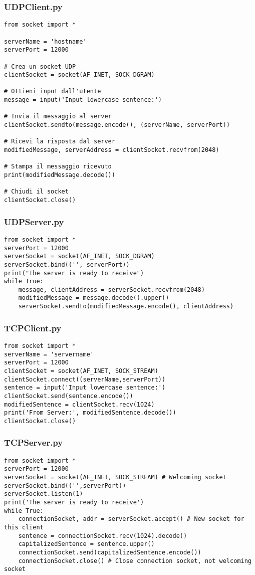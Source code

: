 \subsubsection{UDPClient.py}
\begin{verbatim}
from socket import *

serverName = 'hostname'
serverPort = 12000

# Crea un socket UDP
clientSocket = socket(AF_INET, SOCK_DGRAM)

# Ottieni input dall'utente
message = input('Input lowercase sentence:')

# Invia il messaggio al server
clientSocket.sendto(message.encode(), (serverName, serverPort))

# Ricevi la risposta dal server
modifiedMessage, serverAddress = clientSocket.recvfrom(2048)

# Stampa il messaggio ricevuto
print(modifiedMessage.decode())

# Chiudi il socket
clientSocket.close()
\end{verbatim}

\subsubsection{UDPServer.py}
\begin{verbatim}
from socket import *
serverPort = 12000
serverSocket = socket(AF_INET, SOCK_DGRAM)
serverSocket.bind(('', serverPort))
print("The server is ready to receive")
while True:
    message, clientAddress = serverSocket.recvfrom(2048)
    modifiedMessage = message.decode().upper()
    serverSocket.sendto(modifiedMessage.encode(), clientAddress)
\end{verbatim}

\subsubsection{TCPClient.py}
\begin{verbatim}
from socket import *
serverName = 'servername'
serverPort = 12000
clientSocket = socket(AF_INET, SOCK_STREAM)
clientSocket.connect((serverName,serverPort))
sentence = input('Input lowercase sentence:')
clientSocket.send(sentence.encode())
modifiedSentence = clientSocket.recv(1024)
print('From Server:', modifiedSentence.decode())
clientSocket.close()
\end{verbatim}

\subsubsection{TCPServer.py}
\begin{verbatim}
from socket import *
serverPort = 12000
serverSocket = socket(AF_INET, SOCK_STREAM) # Welcoming socket
serverSocket.bind(('',serverPort))
serverSocket.listen(1)
print('The server is ready to receive')
while True:
    connectionSocket, addr = serverSocket.accept() # New socket for this client
    sentence = connectionSocket.recv(1024).decode()
    capitalizedSentence = sentence.upper()
    connectionSocket.send(capitalizedSentence.encode())
    connectionSocket.close() # Close connection socket, not welcoming socket
\end{verbatim}


